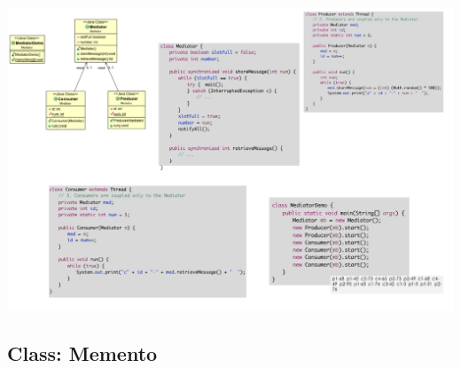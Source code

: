 \documentclass{article}
\begin{document}
\begin{center}
    \includegraphics[scale=0.35]{Images/67.png}
\end{center}

\subsection{Class: Memento}
\end{document}
